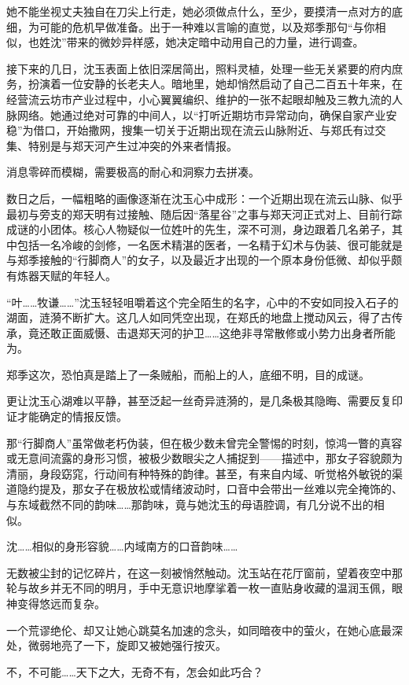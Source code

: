 她不能坐视丈夫独自在刀尖上行走，她必须做点什么，至少，要摸清一点对方的底细，为可能的危机早做准备。出于一种难以言喻的直觉，以及郑季那句“与你相似，也姓沈”带来的微妙异样感，她决定暗中动用自己的力量，进行调查。

接下来的几日，沈玉表面上依旧深居简出，照料灵植，处理一些无关紧要的府内庶务，扮演着一位安静的长老夫人。暗地里，她却悄然启动了自己二百五十年来，在经营流云坊市产业过程中，小心翼翼编织、维护的一张不起眼却触及三教九流的人脉网络。她通过绝对可靠的中间人，以“打听近期坊市异常动向，确保自家产业安稳”为借口，开始撒网，搜集一切关于近期出现在流云山脉附近、与郑氏有过交集、特别是与郑天河产生过冲突的外来者情报。

消息零碎而模糊，需要极高的耐心和洞察力去拼凑。

数日之后，一幅粗略的画像逐渐在沈玉心中成形：一个近期出现在流云山脉、似乎最初与旁支的郑天明有过接触、随后因“落星谷”之事与郑天河正式对上、目前行踪成谜的小团体。核心人物疑似一位姓叶的先生，深不可测，身边跟着几名弟子，其中包括一名冷峻的剑修，一名医术精湛的医者，一名精于幻术与伪装、很可能就是与郑季接触的“行脚商人”的女子，以及最近才出现的一个原本身份低微、却似乎颇有炼器天赋的年轻人。

“叶……牧谦……”沈玉轻轻咀嚼着这个完全陌生的名字，心中的不安如同投入石子的湖面，涟漪不断扩大。这几人如同凭空出现，在郑氏的地盘上搅动风云，得了古传承，竟还敢正面威慑、击退郑天河的护卫……这绝非寻常散修或小势力出身者所能为。

郑季这次，恐怕真是踏上了一条贼船，而船上的人，底细不明，目的成谜。

更让沈玉心湖难以平静，甚至泛起一丝奇异涟漪的，是几条极其隐晦、需要反复印证才能确定的情报反馈。

那“行脚商人”虽常做老朽伪装，但在极少数未曾完全警惕的时刻，惊鸿一瞥的真容或无意间流露的身形习惯，被极少数眼尖之人捕捉到——描述中，那女子容貌颇为清丽，身段窈窕，行动间有种特殊的韵律。甚至，有来自内域、听觉格外敏锐的渠道隐约提及，那女子在极放松或情绪波动时，口音中会带出一丝难以完全掩饰的、与东域截然不同的韵味……那韵味，竟与她沈玉的母语腔调，有几分说不出的相似。

沈……相似的身形容貌……内域南方的口音韵味……

无数被尘封的记忆碎片，在这一刻被悄然触动。沈玉站在花厅窗前，望着夜空中那轮与故乡并无不同的明月，手中无意识地摩挲着一枚一直贴身收藏的温润玉佩，眼神变得悠远而复杂。

一个荒谬绝伦、却又让她心跳莫名加速的念头，如同暗夜中的萤火，在她心底最深处，微弱地亮了一下，旋即又被她强行按灭。

不，不可能……天下之大，无奇不有，怎会如此巧合？

